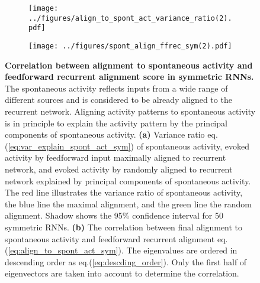 \documentclass[11pt]{article}
\begin{document}
		\begin{figure}
			\centering
			\begin{subfigure}[b]{0.44\textwidth} 
				\texttt{[image: ../figures/align\_to\_spont\_act\_variance\_ratio(2).pdf]}
				\caption{}
				\label{fig:variance_ratio_sym}
			\end{subfigure}
			\hfill
			\begin{subfigure}[b]{0.45\textwidth}
				\texttt{[image: ../figures/spont\_align\_ffrec\_sym(2).pdf]}
				\caption{}
				\label{fig:align_spont_sym}
			\end{subfigure}
			\caption[Correlation between alignment to spontaneous activity and feedforward recurrent alignment score in symmetric RNNs]{\textbf{Correlation between alignment to spontaneous activity and feedforward recurrent alignment score in symmetric RNNs.} The spontaneous activity reflects inputs from a wide range of different sources and is considered to be already aligned to the recurrent network\cite{tragenap2023nature}. Aligning activity patterns to spontaneous activity is in principle to explain the activity pattern by the principal components of spontaneous activity. \textbf{(a)} Variance ratio eq.(\ref{eq:var_explain_spont_act_sym}) of spontaneous activity, evoked activity by feedforward input maximally aligned to recurrent network, and evoked activity by randomly aligned to recurrent network explained by principal components of spontaneous activity. The red line illustrates the variance ratio of spontaneous activity, the blue line the maximal alignment, and the green line the random alignment. Shadow shows the 95\% confidence interval for 50 symmetric RNNs. \textbf{(b)} The correlation between final alignment to spontaneous activity and feedforward recurrent alignment eq.(\ref{eq:align_to_spont_act_sym}). The eigenvalues are ordered in descending order as eq.(\ref{eq:descding_order}). Only the first half of eigenvectors are taken into account to determine the correlation.}
			\label{fig:align_spont_act_sym}
		\end{figure}

	
	\clearpage
\end{document}
